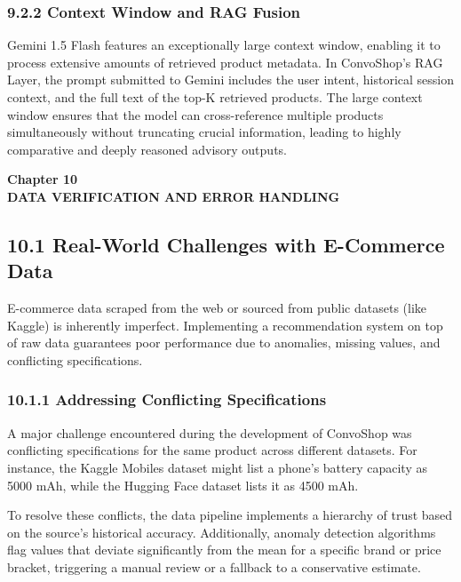\subsubsection*{9.2.2 Context Window and RAG Fusion}
Gemini 1.5 Flash features an exceptionally large context window, enabling it to process extensive amounts of retrieved product metadata. In ConvoShop's RAG Layer, the prompt submitted to Gemini includes the user intent, historical session context, and the full text of the top-K retrieved products. The large context window ensures that the model can cross-reference multiple products simultaneously without truncating crucial information, leading to highly comparative and deeply reasoned advisory outputs.

\newpage
\begin{center}
{\fontsize{14}{17}\bfseries Chapter 10\\[6pt]}
{\fontsize{16}{20}\bfseries DATA VERIFICATION AND ERROR HANDLING\\[10pt]}
\end{center}

\subsection*{10.1 Real-World Challenges with E-Commerce Data}
E-commerce data scraped from the web or sourced from public datasets (like Kaggle) is inherently imperfect. Implementing a recommendation system on top of raw data guarantees poor performance due to anomalies, missing values, and conflicting specifications.

\subsubsection*{10.1.1 Addressing Conflicting Specifications}
A major challenge encountered during the development of ConvoShop was conflicting specifications for the same product across different datasets. For instance, the Kaggle Mobiles dataset might list a phone's battery capacity as 5000 mAh, while the Hugging Face dataset lists it as 4500 mAh. 

To resolve these conflicts, the data pipeline implements a hierarchy of trust based on the source's historical accuracy. Additionally, anomaly detection algorithms flag values that deviate significantly from the mean for a specific brand or price bracket, triggering a manual review or a fallback to a conservative estimate.

